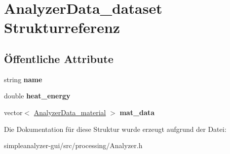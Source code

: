 \hypertarget{structAnalyzerData__dataset}{\section{Analyzer\-Data\-\_\-dataset Strukturreferenz}
\label{structAnalyzerData__dataset}
}
\subsection*{Öffentliche Attribute}
\begin{DoxyCompactItemize}
\item 
\hypertarget{structAnalyzerData__dataset_aec7f1c57906c7e5bc821f127d803afe3}{string {\bfseries name}}\label{structAnalyzerData__dataset_aec7f1c57906c7e5bc821f127d803afe3}

\item 
\hypertarget{structAnalyzerData__dataset_a4ef750609b9311be44bf60a3f5b00321}{double {\bfseries heat\-\_\-energy}}\label{structAnalyzerData__dataset_a4ef750609b9311be44bf60a3f5b00321}

\item 
\hypertarget{structAnalyzerData__dataset_a56f26f1202857c8ade9e486da0ee4372}{vector$<$ \hyperlink{structAnalyzerData__material}{Analyzer\-Data\-\_\-material} $>$ {\bfseries mat\-\_\-data}}\label{structAnalyzerData__dataset_a56f26f1202857c8ade9e486da0ee4372}

\end{DoxyCompactItemize}


Die Dokumentation für diese Struktur wurde erzeugt aufgrund der Datei\-:\begin{DoxyCompactItemize}
\item 
simpleanalyzer-\/gui/src/processing/Analyzer.\-h\end{DoxyCompactItemize}
